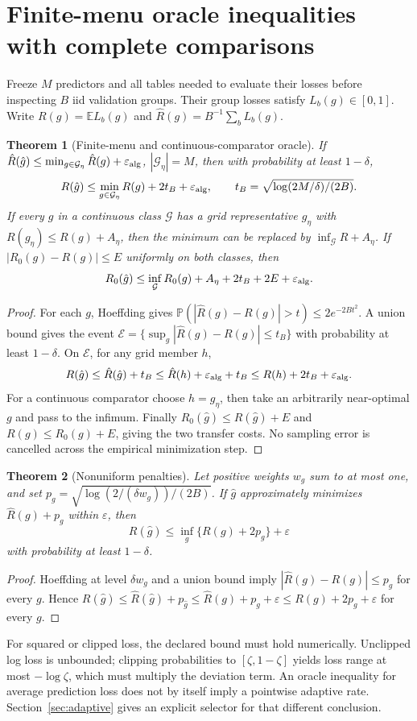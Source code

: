\documentclass[11pt,a4paper]{article}
\newcommand{\E}{\mathbb E}\newcommand{\Pp}{\mathbb P}
\numberwithin{equation}{section}
\newtheorem{theorem}{Theorem}[section]
\theoremstyle{definition}\newtheorem{definition}[theorem]{Definition}
\theoremstyle{remark}\newtheorem{remark}[theorem]{Remark}
\begin{document}
\section{Finite-menu oracle inequalities with complete comparisons}\label{sec:oracle}
Freeze $M$ predictors and all tables needed to evaluate their losses before inspecting $B$ iid validation groups. Their group losses satisfy $L_b(g)\in[0,1]$. Write $R(g)=\E L_b(g)$ and $\hat R(g)=B^{-1}\sum_bL_b(g)$.

\begin{theorem}[Finite-menu and continuous-comparator oracle]\label{thm:oracle}
If $\hat R(\hat g)\le\min_{g\in\mathcal G_\eta}\hat R(g)+\varepsilon_{\rm alg}$, $|\mathcal G_\eta|=M$, then with probability at least $1-\delta$,
\[
 R(\hat g)\le\min_{g\in\mathcal G_\eta}R(g)+2t_B+\varepsilon_{\rm alg},
 \qquad t_B=\sqrt{\log(2M/\delta)/(2B)}.
\]
If every $g$ in a continuous class $\mathcal G$ has a grid representative $g_\eta$ with
$R(g_\eta)\le R(g)+A_\eta$, then the minimum can be replaced by
$\inf_{\mathcal G}R+A_\eta$. If $|R_0(g)-R(g)|\le E$ uniformly on both classes, then
\[
 R_0(\hat g)\le\inf_{\mathcal G}R_0(g)+A_\eta+2t_B+2E+\varepsilon_{\rm alg}. \label{eq:oracle}
\]
\end{theorem}
\begin{proof}
For each $g$, Hoeffding gives
$\Pp(|\hat R(g)-R(g)|>t)\le2e^{-2Bt^2}$. A union bound gives the event
$\mathcal E=\{\sup_g|\hat R(g)-R(g)|\le t_B\}$ with probability at least $1-\delta$.
On $\mathcal E$, for any grid member $h$,
\[
 R(\hat g)\le\hat R(\hat g)+t_B
 \le\hat R(h)+\varepsilon_{\rm alg}+t_B
 \le R(h)+2t_B+\varepsilon_{\rm alg}.
\]
For a continuous comparator choose $h=g_\eta$, then take an arbitrarily near-optimal $g$ and pass to the infimum. Finally $R_0(\hat g)\le R(\hat g)+E$ and
$R(g)\le R_0(g)+E$, giving the two transfer costs. No sampling error is cancelled across the empirical minimization step.
\end{proof}

\begin{theorem}[Nonuniform penalties]\label{thm:penalty}
Let positive weights $w_g$ sum to at most one, and set
$p_g=\sqrt{\log(2/(\delta w_g))/(2B)}$.
If $\hat g$ approximately minimizes $\hat R(g)+p_g$ within $\varepsilon$, then
\[
 R(\hat g)\le\inf_g\{R(g)+2p_g\}+\varepsilon
\]
with probability at least $1-\delta$.
\end{theorem}
\begin{proof}
Hoeffding at level $\delta w_g$ and a union bound imply $|\hat R(g)-R(g)|\le p_g$ for every $g$. Hence
$R(\hat g)\le\hat R(\hat g)+p_{\hat g}\le\hat R(g)+p_g+\varepsilon\le R(g)+2p_g+\varepsilon$ for every $g$.
\end{proof}
For squared or clipped loss, the declared bound must hold numerically. Unclipped log loss is unbounded; clipping probabilities to $[\zeta,1-\zeta]$ yields loss range at most $-\log\zeta$, which must multiply the deviation term. An oracle inequality for average prediction loss does not by itself imply a pointwise adaptive rate. Section~\ref{sec:adaptive} gives an explicit selector for that different conclusion.
\end{document}
